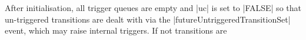 After initialisation, all trigger queues are empty 
and |uc| is set to |FALSE| so that un-triggered transitions are dealt with via the
|futureUntriggeredTransitionSet| event, which may raise internal triggers.
If not transitions are









